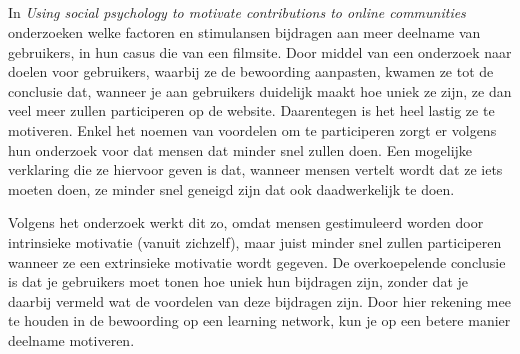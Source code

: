 \documentclass[a4paper, 10pt, pdftex]{report}
\begin{document}
      \subsection{\cite{Beenen2004}}

      In \emph{Using social psychology to motivate contributions to online communities} onderzoeken \citeauthor{Beenen2004} welke factoren en stimulansen bijdragen aan meer deelname van gebruikers, in hun casus die van een filmsite. Door middel van een onderzoek naar doelen voor gebruikers, waarbij ze de bewoording aanpasten, kwamen ze tot de conclusie dat, wanneer je aan gebruikers duidelijk maakt hoe uniek ze zijn, ze dan veel meer zullen participeren op de website. Daarentegen is het heel lastig ze te motiveren. Enkel het noemen van voordelen om te participeren zorgt er volgens hun onderzoek voor dat mensen dat minder snel zullen doen. Een mogelijke verklaring die ze hiervoor geven is dat, wanneer mensen vertelt wordt dat ze iets moeten doen, ze minder snel geneigd zijn dat ook daadwerkelijk te doen.

      Volgens het onderzoek werkt dit zo, omdat mensen gestimuleerd worden door intrinsieke motivatie (vanuit zichzelf), maar juist minder snel zullen participeren wanneer ze een extrinsieke motivatie wordt gegeven. De overkoepelende conclusie is dat je gebruikers moet tonen hoe uniek hun bijdragen zijn, zonder dat je daarbij vermeld wat de voordelen van deze bijdragen zijn. Door hier rekening mee te houden in de bewoording op een learning network, kun je op een betere manier deelname motiveren.

     \subsection{\cite{Sohn2005}}
\end{document}
